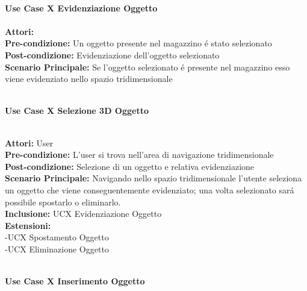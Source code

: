 \vspace{0.5cm}

\Large\textbf{}\\
\Large\textbf{Use Case X Evidenziazione Oggetto} \\

\large\textbf{} \\
\textbf{Attori:}\\
\textbf{Pre-condizione:} Un oggetto presente nel magazzino é stato selezionato \\
\textbf{Post-condizione: } Evidenziazione dell'oggetto selezionato \\
\textbf{Scenario Principale:}  Se l'oggetto selezionato é presente nel magazzino esso viene evidenziato nello spazio tridimensionale\\

\vspace{0.5cm}
\newpage

\Large\textbf{}\\
\Large\textbf{Use Case X Selezione 3D Oggetto} \\

\vspace{0.5cm}

\large\textbf{} \\
\textbf{Attori:} User\\
\textbf{Pre-condizione:} L'user si trova nell'area di navigazione tridimensionale \\
\textbf{Post-condizione: } Selezione di un oggetto e relativa evidenziazione\\
\textbf{Scenario Principale:}  Navigando nello spazio tridimensionale l'utente seleziona un oggetto che viene conseguentemente evidenziato; una volta selezionato sará possibile spostarlo o eliminarlo.\\
\textbf{Inclusione:} UCX Evidenziazione Oggetto \\
\textbf{Estensioni:} \\ 
-UCX Spostamento Oggetto \\ -UCX Eliminazione Oggetto

\vspace{0.5cm}


\Large\textbf{}\\
\Large\textbf{Use Case X Inserimento Oggetto} \\


